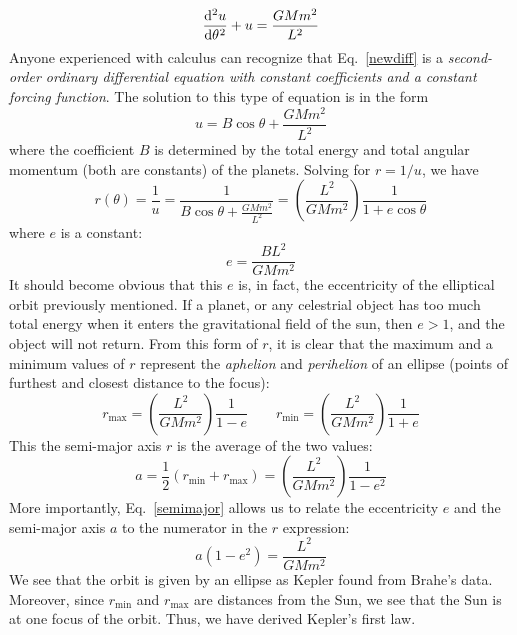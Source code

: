 \documentclass{../../oss-handout}
\begin{document}
\begin{equation}
  \diff[2]u\theta + u = \frac{GMm^2}{L^2}
  \label{newdiff}
\end{equation}
Anyone experienced with calculus can recognize that Eq.\ \ref{newdiff} is a
\emph{second-order ordinary differential equation with constant coefficients
  and a constant forcing function}. The solution to this type of equation is in
the form
\begin{equation} 
  u =B\cos\theta + \frac{GMm^2}{L^2}
\end{equation}
where the coefficient $B$ is determined by the total energy and total angular
momentum (both are constants) of the planets. Solving for $r=1/u$, we have
\begin{equation}
  r(\theta)=\frac1u = \frac1{B\cos\theta+ \frac{GMm^2}{L^2}}
  =\left(\frac{L^2}{GMm^2}\right)\frac1{1+e\cos\theta}
\end{equation}
where $e$ is a constant:
\begin{equation}
  e=\dfrac{BL^2}{GMm^2}
\end{equation}
It should become obvious that this $e$ is, in fact, the eccentricity of the
elliptical orbit previously mentioned. If a planet, or any celestrial object
has too much total energy when it enters the gravitational field of the sun,
then $e>1$, and the object will not return. From this form of $r$, it is clear
that the maximum and a minimum values of $r$ represent the \emph{aphelion} and
\emph{perihelion} of an ellipse (points of furthest and closest distance to the
focus):
\begin{equation}
  r_\text{max}=\left(\frac{L^2}{GMm^2}\right)\frac1{1-e}
  \quad\quad
  r_\text{min}=\left(\frac{L^2}{GMm^2}\right)\frac1{1+e}
\end{equation}
This the semi-major axis $r$ is the average of the two values:
\begin{equation}
  a=\dfrac12\left(r_\text{min} + r_\text{max}\right)=
  \left(\frac{L^2}{GMm^2}\right)\frac1{1-e^2}
  \label{semimajor}
\end{equation}
More importantly, Eq.\ \ref{semimajor} allows us to relate the eccentricity
$e$ and the semi-major axis $a$ to the numerator in the $r$ expression:
\begin{equation}
  a(1-e^2)=\frac{L^2}{GMm^2}
  \label{eq:numerator}
\end{equation}
We see that the orbit is given by an ellipse as Kepler found from Brahe's data.
Moreover, since $r_\text{min}$ and $r_\text{max}$ are distances from the Sun, we
see that the Sun is at one focus of the orbit. Thus, we have derived Kepler's
first law.
\end{document}
